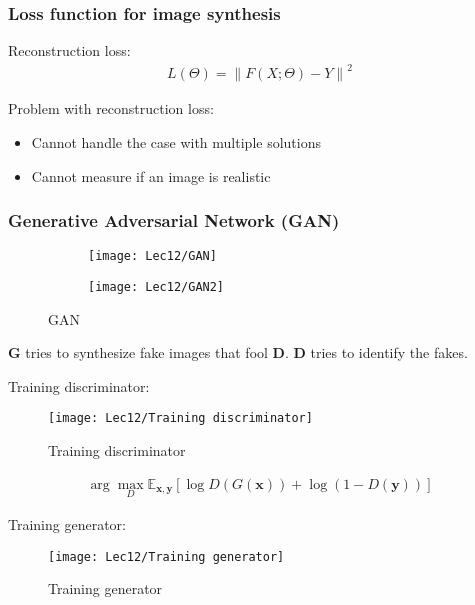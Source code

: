\subsubsection{Loss function for image synthesis}
Reconstruction loss: 
\begin{align*}
    L(\Theta )=\left\| F(X;\Theta)-Y \right\|^2
\end{align*}

Problem with reconstruction loss: 
\begin{itemize}
    \item Cannot handle the case with multiple
    solutions
    \item Cannot measure if an image is
    realistic
\end{itemize}

\subsubsection{Generative Adversarial Network (GAN)}
\begin{figure}[H]
    \centering
    \begin{subfigure}{0.618\textwidth}
        \centering
        \texttt{[image: Lec12/GAN]}
    \end{subfigure}

    \begin{subfigure}{0.618\textwidth}
        \centering
        \texttt{[image: Lec12/GAN2]}
    \end{subfigure}
    \caption{GAN}
\end{figure}

\textbf{G} tries to synthesize fake images that fool \textbf{D}. \textbf{D} tries to identify the fakes. 

Training discriminator: 

\begin{figure}[H]
    \centering
    \texttt{[image: Lec12/Training discriminator]}
    \caption{Training discriminator}
\end{figure}

\begin{align*}
    \arg \max_D \mathbb{E}_{\mathbf{x,y}}\left[ \log D(G(\mathbf{x}))+\log (1-D(\mathbf{y})) \right]
\end{align*}

Training generator: 

\begin{figure}[H]
    \centering
    \texttt{[image: Lec12/Training generator]}
    \caption{Training generator}
\end{figure}

